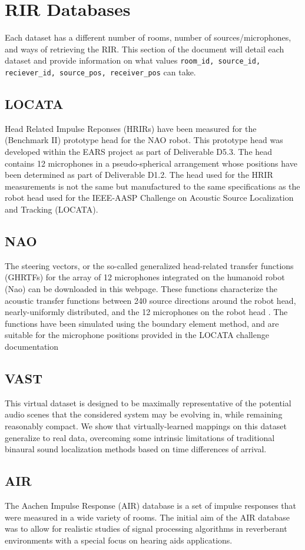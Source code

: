 \documentclass{article}
\begin{document}
\section{RIR Databases}
Each dataset has a different number of rooms, number of sources/microphones, and ways of retrieving the RIR. This section of the document will detail each dataset and provide information on what values \texttt{room\_id, source\_id, reciever\_id, source\_pos, receiver\_pos} can take.
\subsection{LOCATA}
Head Related Impulse Reponses (HRIRs) have been measured for the (Benchmark II) prototype head for the NAO robot. This prototype head was developed within the EARS project as part of Deliverable D5.3. The head contains 12 microphones in a pseudo-spherical arrangement whose positions have been determined as part of Deliverable D1.2. The head used for the HRIR measurements is not the same but manufactured to the same specifications as the robot head used for the IEEE-AASP Challenge on Acoustic Source Localization and Tracking (LOCATA). 
\subsection{NAO}
The steering vectors, or the so-called generalized head-related transfer functions (GHRTFs) for the array of 12 microphones integrated on the humanoid robot (Nao) can be downloaded in this webpage. These functions characterize the acoustic transfer functions between 240 source directions around the robot head, nearly-uniformly distributed, and the 12 microphones on the robot head . The functions have been simulated using the boundary element method, and are suitable for the microphone positions provided in the LOCATA challenge documentation
\subsection{VAST}
This virtual dataset is designed to be maximally representative of the potential audio scenes that the considered system may be evolving in, while remaining reasonably compact. We show that virtually-learned mappings on this dataset generalize to real data, overcoming some intrinsic limitations of traditional binaural sound localization methods based on time differences of arrival.
\subsection{AIR}
The Aachen Impulse Response (AIR) database is a set of impulse responses that were measured in a wide variety of rooms. The initial aim of the AIR database was to allow for realistic studies of signal processing algorithms in reverberant environments with a special focus on hearing aids applications.
\end{document}
